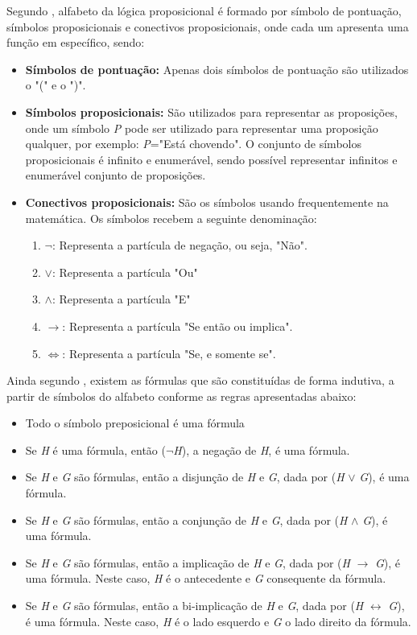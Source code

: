 Segundo , alfabeto da lógica proposicional é formado por símbolo de pontuação, símbolos proposicionais e conectivos proposicionais, onde cada um apresenta uma função em específico, sendo:
\begin{itemize}
  \item \textbf{Símbolos de pontuação: }Apenas dois símbolos de pontuação são utilizados o "(" e o ")".
  \item \textbf{Símbolos proposicionais:} São utilizados para representar as proposições, onde um símbolo \textit{P} pode ser utilizado para representar uma proposição qualquer, por exemplo: \textit{P}="Está chovendo". O conjunto de símbolos proposicionais é infinito e enumerável, sendo possível representar infinitos e enumerável conjunto de proposições.
  \item \textbf{Conectivos proposicionais:} São os símbolos usando frequentemente na matemática. Os símbolos recebem a seguinte denominação: 
\begin{enumerate}
\item \textbf{$\neg$}: Representa a partícula de negação, ou seja, "Não".
\item \textbf{$\lor$}: Representa a partícula "Ou"
\item \textbf{$\land$}: Representa a partícula "E"
\item \textbf{$\rightarrow$}: Representa a partícula "Se então ou implica".
\item \textbf{$\Leftrightarrow$}: Representa a partícula "Se, e somente se".
\end{enumerate} 
\end{itemize}

Ainda segundo , existem as fórmulas que são constituídas de forma indutiva, a partir de símbolos do alfabeto conforme as regras apresentadas abaixo:
\begin{itemize}
\item Todo o símbolo preposicional é uma fórmula
\item Se \textit{H} é uma fórmula, então ($\neg$\textit{H}), a negação de \textit{H}, é uma fórmula.
\item Se \textit{H} e \textit{G} são fórmulas, então a disjunção de \textit{H} e \textit{G}, dada por (\textit{H} $\lor$ \textit{G}), é uma fórmula.
\item Se \textit{H} e \textit{G} são fórmulas, então a conjunção de \textit{H} e \textit{G}, dada por (\textit{H} $\land$ \textit{G}), é uma fórmula.
\item Se \textit{H} e \textit{G} são fórmulas, então a implicação de \textit{H} e \textit{G}, dada por (\textit{H} $\rightarrow$ \textit{G}), é uma fórmula. Neste caso, \textit{H} é o antecedente e \textit{G} consequente da fórmula.
\item Se \textit{H} e \textit{G} são fórmulas, então a bi-implicação de \textit{H} e \textit{G}, dada por (\textit{H} $\leftrightarrow$ \textit{G}), é uma fórmula. Neste caso, \textit{H} é o lado esquerdo e \textit{G} o lado direito da fórmula.
\end{itemize}

